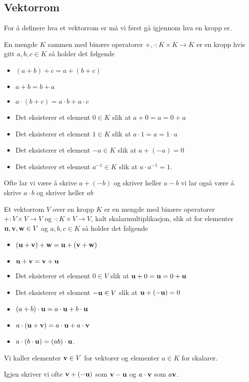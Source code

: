 \subsection{Vektorrom}\label{Sec:Vekt}
For å definere hva et vektorrom er må vi først gå igjennom hva en kropp er.

\begin{definisjon}\label{Def:Kropp}
   En mengde $K$ sammen med binære operatorer $+,\cdot: K\times K\to K$ er en kropp hvis gitt $a,b,c\in K$ så holder det følgende
   \begin{itemize}
    \item $(a+b)+c = a+(b+c)$
    \item $a+b = b+a$
    \item $a\cdot(b+c)=a\cdot b + a\cdot c$
    \item Det eksisterer et element $0\in K$ slik at $a+0=a=0+a$
    \item Det eksisterer et element $1\in K$ slik at $a\cdot 1 = a = 1\cdot a$
    \item Det eksisterer et element $-a\in K$ slik at $a+ (-a) = 0$
    \item Det eksisterer et element $a^{-1}\in K$ slik at $a\cdot a^{-1}=1$.
   \end{itemize} 
\end{definisjon}
Ofte lar vi være å skrive $a+(-b)$ og skriver heller $a-b$ vi lar også være å skrive $a\cdot b$ og skriver heller $ab$

\begin{definisjon}\label{Def:Vektrom}
    Et vektorrom $V$ over en kropp $K$ er en mengde med binære operatorer $+:V\times V\to V$ og $\cdot: K\times V\to V$, kalt skalarmultiplikasjon, slik at for elementer $\textbf{u},\textbf{v},\textbf{w}\in V$ og $a,b,c\in K$ så holder det følgende
    \begin{itemize}
    \item $(\textbf{u}+\textbf{v})+\textbf{w} = \textbf{u}+(\textbf{v}+\textbf{w})$
    \item $\textbf{u}+\textbf{v}=\textbf{v}+\textbf{u}$
    \item Det eksisterer et element $0\in V$ slik at $\textbf{u}+0=\textbf{u}=0+\textbf{u}$
    \item Det eksisterer et element $-\textbf{u}\in V$ slik at $\textbf{u}+(-\textbf{u})=0$
    \item $(a+b)\cdot \textbf{u} = a\cdot \textbf{u} + b\cdot \textbf{u}$
    \item $a\cdot(\textbf{u}+\textbf{v}) = a\cdot \textbf{u} + a\cdot \textbf{v}$
    \item $a\cdot (b\cdot \textbf{u}) = (ab)\cdot \textbf{u}$.
    \end{itemize}
    Vi kaller elementer $\textbf{v}\in V$ for vektorer og elementer $a\in K$ for skalarer.
\end{definisjon}
Igjen skriver vi ofte $\textbf{v}+(-\textbf{u})$ som $\textbf{v}-\textbf{u}$ og $a\cdot \textbf{v}$ som $a\textbf{v}$.

